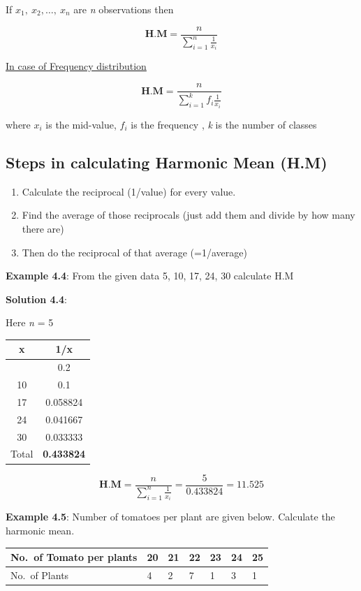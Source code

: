 \documentclass[
]{book}
\begin{document}
If \(x_{1},\ x_{2},\ldots,\ x_{n}\) are \emph{n} observations then

\[\mathbf{\text{H.M}} = \frac{n}{\sum_{i = 1}^{n}\frac{1}{x_{i}}}\]

\ul{In case of Frequency distribution}

\[\mathbf{\text{H.M}} = \frac{n}{\sum_{i = 1}^{k}{f_{i}\frac{1}{x_{i}}}}\]

where \(x_{i}\) is the mid-value, \(f_{i}\) is the frequency , \emph{k} is the
number of classes

\subsection{Steps in calculating Harmonic Mean (H.M)}\label{steps-in-calculating-harmonic-mean-h.m}

\begin{enumerate}
\def\labelenumi{\arabic{enumi}.}
\item
  Calculate the reciprocal (1/value) for every value.
\item
  Find the average of those reciprocals (just add them and divide by
  how many there are)
\item
  Then do the reciprocal of that average (=1/average)
\end{enumerate}

\textbf{Example 4.4}: From the given data 5, 10, 17, 24, 30 calculate H.M

\textbf{Solution 4.4}:

Here \emph{n} = 5

\begin{longtable}[]{@{}cc@{}}
\toprule\noalign{}
x & 1/x \\
\midrule\noalign{}
\endhead
\bottomrule\noalign{}
\endlastfoot
5 & 0.2 \\
10 & 0.1 \\
17 & 0.058824 \\
24 & 0.041667 \\
30 & 0.033333 \\
Total & \textbf{0.433824} \\
\end{longtable}

\[\mathbf{\text{H.M}} = \frac{n}{\sum_{i = 1}^{n}\frac{1}{x_{i}}} = \frac{5}{0.433824} = 11.525\]

\textbf{Example 4.5}: Number of tomatoes per plant are given below. Calculate
the harmonic mean.

\begin{longtable}[]{@{}lllllll@{}}
\toprule\noalign{}
No.~of Tomato per plants & 20 & 21 & 22 & 23 & 24 & 25 \\
\midrule\noalign{}
\endhead
\bottomrule\noalign{}
\endlastfoot
No.~of Plants & 4 & 2 & 7 & 1 & 3 & 1 \\
\end{longtable}
\end{document}
